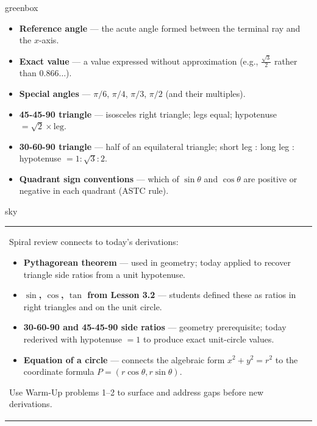 \documentclass[10pt]{article}
\begin{document}
\begin{skillbox}{greenbox}
\begin{itemize}
  \item \textbf{Reference angle} --- the acute angle formed between the terminal ray and the $x$-axis.
  \item \textbf{Exact value} --- a value expressed without approximation (e.g., $\tfrac{\sqrt{3}}{2}$ rather than $0.866\ldots$).
  \item \textbf{Special angles} --- $\pi/6$, $\pi/4$, $\pi/3$, $\pi/2$ (and their multiples).
  \item \textbf{45-45-90 triangle} --- isosceles right triangle; legs equal; hypotenuse $= \sqrt{2}\times\text{leg}$.
  \item \textbf{30-60-90 triangle} --- half of an equilateral triangle; short leg : long leg : hypotenuse $= 1 : \sqrt{3} : 2$.
  \item \textbf{Quadrant sign conventions} --- which of $\sin\theta$ and $\cos\theta$ are positive or negative in each quadrant (ASTC rule).
\end{itemize}
\end{skillbox}
\vspace{6pt}

\begin{skillbox}{sky}
\begin{tabularx}{\linewidth}{@{}X@{}}
Spiral review connects to today's derivations:
\begin{itemize}
  \item \textbf{Pythagorean theorem} --- used in geometry; today applied to recover triangle side ratios from a unit hypotenuse.
  \item \textbf{$\sin$, $\cos$, $\tan$ from Lesson 3.2} --- students defined these as ratios in right triangles and on the unit circle.
  \item \textbf{30-60-90 and 45-45-90 side ratios} --- geometry prerequisite; today rederived with hypotenuse $= 1$ to produce exact unit-circle values.
  \item \textbf{Equation of a circle} --- connects the algebraic form $x^2+y^2=r^2$ to the coordinate formula $P=(r\cos\theta, r\sin\theta)$.
\end{itemize}
Use Warm-Up problems 1--2 to surface and address gaps before new derivations.
\end{tabularx}
\end{skillbox}
\vspace{6pt}
\end{document}

